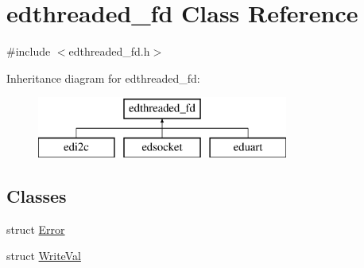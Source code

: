 \hypertarget{classedthreaded__fd}{\section{edthreaded\-\_\-fd Class Reference}
\label{classedthreaded__fd}
}


{\ttfamily \#include $<$edthreaded\-\_\-fd.\-h$>$}

Inheritance diagram for edthreaded\-\_\-fd\-:\begin{figure}[H]
\begin{center}
\leavevmode
\includegraphics[height=2.000000cm]{classedthreaded__fd}
\end{center}
\end{figure}
\subsection*{Classes}
\begin{DoxyCompactItemize}
\item 
struct \hyperlink{structedthreaded__fd_1_1Error}{Error}
\item 
struct \hyperlink{structedthreaded__fd_1_1WriteVal}{Write\-Val}
\end{DoxyCompactItemize}
